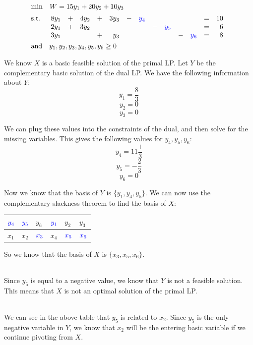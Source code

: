 \documentclass[12pt]{article}
\begin{document}
\newpage
\begin{align*}
  &\mathrm{min} \quad W = 15y_1 + 20y_2 + 10y_3 \\[2pt]
  &\mathrm{s.t.} \quad 
  \begin{array}[t]{r c r c r c r c r c r c r c}
      8y_1 & + & 4y_2 & + & 3y_3 & - & \textcolor{blue}{y_4} & & & & & = & 10 \\
      2y_1 & + & 3y_2 & & & & & - & \textcolor{blue}{y_5} & & & = & 6 \\
      3y_1 & & & + & y_3 & & & & & - & \textcolor{blue}{y_6} & = & 8
  \end{array}\\
  &\mathrm{and} \quad y_1, y_2, y_3, y_4, y_5, y_6 \geq 0
\end{align*}

\noindent
We know $X$ is a basic feasible solution of the primal LP.
Let $Y$ be the complementary basic solution of the dual LP.
We have the following information about $Y$:
\[ y_1 = \frac{8}{3} \]
\[ y_2 = 0 \]
\[ y_3 = 0 \]

\noindent
We can plug these values into the constraints of the dual, and then solve for the missing variables.
This gives the following values for $y_4, y_5, y_6$:
\[ y_4 = 11\frac{1}{3} \]
\[ y_5 = -\frac{2}{3} \]
\[ y_6 = 0 \]

\noindent
Now we know that the basis of $Y$ is $\{y_1, y_4, y_5\}$.
We can now use the complementary slackness theorem to find the basis of $X$:

\begin{table}[h]
  \centering
  \begin{tabular}{lll|lll}
  $\textcolor{blue}{y_4}$ & $\textcolor{blue}{y_5}$ & $y_6$ & $\textcolor{blue}{y_1}$ & $y_2$ & $y_3$ \\ \hline
  $x_1$ & $x_2$ & $\textcolor{blue}{x_3}$ & $x_4$ & $\textcolor{blue}{x_5}$ & $\textcolor{blue}{x_6}$
  \end{tabular}
\end{table}

\noindent
So we know that the basis of $X$ is $\{x_3, x_5, x_6\}$.

\noindent
\\
Since $y_5$ is equal to a negative value, we know that $Y$ is not a feasible solution.
This means that $X$ is not an optimal solution of the primal LP.

\noindent
\\
We can see in the above table that $y_5$ is related to $x_2$.
Since $y_5$ is the only negative variable in $Y$, we know that $x_2$ will be the entering basic variable if we continue pivoting from $X$.
\end{document}
